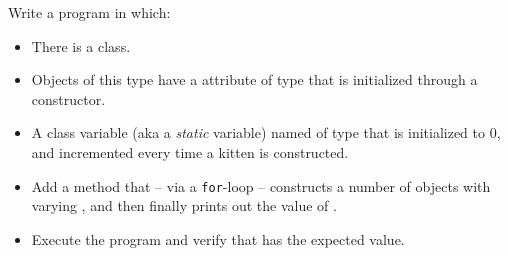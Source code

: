 Write a program in which:
\begin{itemize}
    \item There is a  class.
    \item Objects of this type have a  attribute of type  that is initialized through a constructor.
    \item A class variable (aka a \textsl{static} variable) named  of type  that is initialized to $0$, and incremented every time a kitten is constructed.
    \item Add a  method that -- via a \texttt{for}-loop -- constructs a number of  objects with varying , and then finally prints out the value of .
    \item Execute the program and verify that  has the expected value.
\end{itemize}
